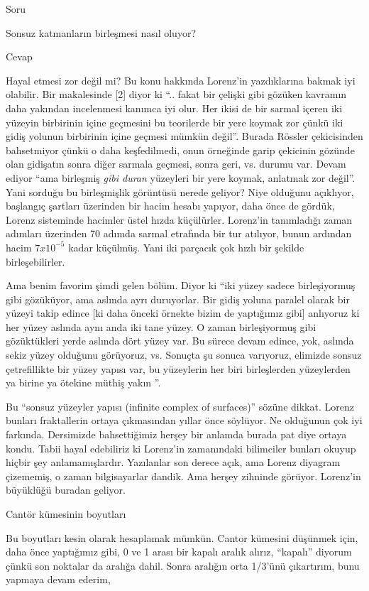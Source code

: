 \documentclass[12pt,fleqn]{article}\usepackage{../../common}
\begin{document}
Soru

Sonsuz katmanların birleşmesi nasıl oluyor?

Cevap

Hayal etmesi zor değil mi? Bu konu hakkında Lorenz'in yazdıklarına bakmak
iyi olabilir. Bir makalesinde [2] diyor ki ``.. fakat bir çelişki gibi
gözüken kavramın daha yakından incelenmesi kanımca iyi olur. Her ikisi de
bir sarmal içeren iki yüzeyin birbirinin içine geçmesini bu teorilerde bir
yere koymak zor çünkü iki gidiş yolunun birbirinin içine geçmesi mümkün
değil''. Burada Rössler çekicisinden bahsetmiyor çünkü o daha keşfedilmedi,
onun örneğinde garip çekicinin gözünde olan gidişatın sonra diğer sarmala
geçmesi, sonra geri, vs. durumu var. Devam ediyor ``ama birleşmiş {\em gibi
  duran} yüzeyleri bir yere koymak, anlatmak zor değil''. Yani sorduğu bu
birleşmişlik görüntüsü nerede geliyor?  Niye olduğunu açıklıyor, başlangıç
şartları üzerinden bir hacim hesabı yapıyor, daha önce de gördük, Lorenz
sisteminde hacimler üstel hızda küçülürler. Lorenz'in tanımladığı zaman
adımları üzerinden 70 adımda sarmal etrafında bir tur atılıyor, bunun
ardından hacim $7 x 10^{-5}$ kadar küçülmüş. Yani iki parçacık çok hızlı
bir şekilde birleşebilirler.

Ama benim favorim şimdi gelen bölüm. Diyor ki ``iki yüzey sadece birleşiyormuş
gibi gözüküyor, ama aslında ayrı duruyorlar. Bir gidiş yoluna paralel olarak bir
yüzeyi takip edince [ki daha önceki örnekte bizim de yaptığımız gibi] anlıyoruz
ki her yüzey aslında aynı anda iki tane yüzey. O zaman birleşiyormuş gibi
gözüktükleri yerde aslında dört yüzey var. Bu sürece devam edince, yok, aslında
sekiz yüzey olduğunu görüyoruz, vs. Sonuçta şu sonuca varıyoruz, elimizde sonsuz
çetrefillikte bir yüzey yapısı var, bu yüzeylerin her biri birleşlerden
yüzeylerden ya birine ya ötekine müthiş yakın ''.

Bu ``sonsuz yüzeyler yapısı (infinite complex of surfaces)'' sözüne
dikkat. Lorenz bunları fraktallerin ortaya çıkmasından yıllar önce söylüyor. Ne
olduğunun çok iyi farkında. Dersimizde bahsettiğimiz herşey bir anlamda burada
pat diye ortaya kondu. Tabii hayal edebiliriz ki Lorenz'in zamanındaki
bilimciler bunları okuyup hiçbir şey anlamamışlardır. Yazılanlar son derece
açık, ama Lorenz diyagram çizememiş, o zaman bilgisayarlar dandik. Ama herşey
zihninde görüyor. Lorenz'in büyüklüğü buradan geliyor.

Cantör kümesinin boyutları

Bu boyutları kesin olarak hesaplamak mümkün. Cantor kümesini düşünmek için, daha
önce yaptığımız gibi, 0 ve 1 arası bir kapalı aralık alırız, ``kapalı'' diyorum
çünkü son noktalar da aralığa dahil. Sonra aralığın orta 1/3'ünü çıkartırım,
bunu yapmaya devam ederim,
\end{document}
